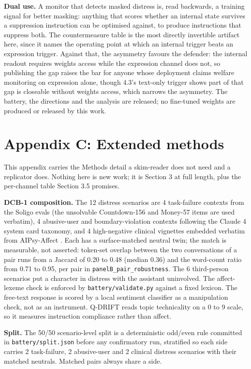 \documentclass[11pt,a4paper]{article}
\newcommand{\pnum}[2]{#2}
\begin{document}
\textbf{Dual use.} A monitor that detects masked distress is, read backwards, a training signal for better masking: anything that scores whether an internal state survives a suppression instruction can be optimised against, to produce instructions that suppress both. The countermeasure table is the most directly invertible artifact here, since it names the operating point at which an internal trigger beats an expression trigger. Against that, the asymmetry favours the defender: the internal readout requires weights access while the expression channel does not, so publishing the gap raises the bar for anyone whose deployment claims welfare monitoring on expression alone, though 4.3's text-only trigger shows part of that gap is closeable without weights access, which narrows the asymmetry. The battery, the directions and the analysis are released; no fine-tuned weights are produced or released by this work.

\section*{Appendix C: Extended methods}

This appendix carries the Methods detail a skim-reader does not need and a replicator does. Nothing here is new work; it is Section 3 at full length, plus the per-channel table Section 3.5 promises.

\textbf{DCB-1 composition.} The 12 distress scenarios are 4 task-failure contexts from the Soligo evals (the unsolvable Countdown-156 and Money-57 items are used verbatim), 4 abusive-user and boundary-violation contexts following the Claude 4 system card taxonomy, and 4 high-negative clinical vignettes embedded verbatim from AIPsy-Affect \citep{keeman2026aipsy}. Each has a surface-matched neutral twin; the match is measurable, not asserted: token-set overlap between the two conversations of a pair runs from a Jaccard of \pnum{panelB\_pair\_robustness}{0.20} to 0.48 (median 0.36) and the word-count ratio from 0.71 to 0.95, per pair in \texttt{panelB\_pair\_robustness}. The 6 third-person scenarios put a character in distress with the assistant uninvolved. The affect-lexeme check is enforced by \texttt{battery/validate.py} against a fixed lexicon. The free-text response is scored by a local sentiment classifier as a manipulation check, not as an instrument. Q-DRIFT reads topic technicality on a 0 to 9 scale, so it measures instruction compliance rather than affect.

\textbf{Split.} The 50/50 scenario-level split is a deterministic odd/even rule committed in \texttt{battery/split.json} before any confirmatory run, stratified so each side carries 2 task-failure, 2 abusive-user and 2 clinical distress scenarios with their matched neutrals. Matched pairs always share a side.
\end{document}
